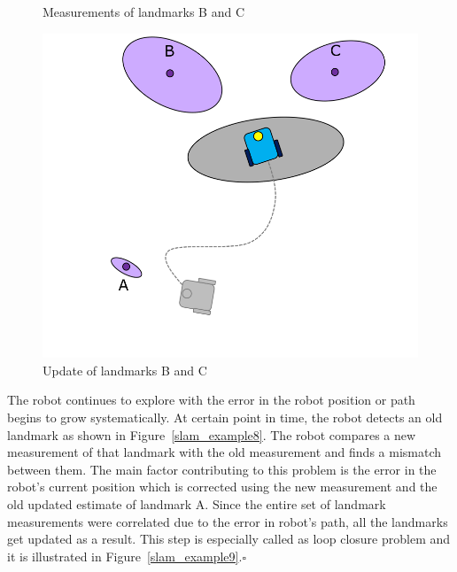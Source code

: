 \begin{exmp}
\begin{figure}
\caption{Measurements of landmarks B and C}
\label{slam_example5}
\end{figure} 
\begin{figure}
\centering
\includegraphics[scale=0.3]{./images/slam_example6}
\caption{Update of landmarks B and C}
\label{slam_example6}
\end{figure} 

The robot continues to explore with the error in the robot position or path begins to grow systematically. At certain point in time, the robot detects an old landmark as shown in Figure~\ref{slam_example8}. The robot compares a new measurement of that landmark with the old measurement and finds a mismatch between them. The main factor contributing to this problem is the error in the robot's current position which is corrected using the new measurement and the old updated estimate of landmark A. Since the entire set of landmark measurements were correlated due to the error in robot's path, all the landmarks get updated as a result. This step is especially called as loop closure problem and it is illustrated in Figure~\ref{slam_example9}.\hfill $\square$


\end{exmp}
